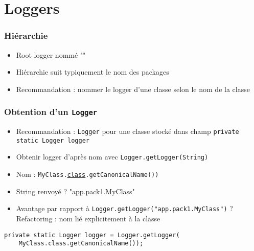 \documentclass[english, french]{beamer}
\begin{document}
\section{Loggers}
\begin{frame}
	\frametitle{Hiérarchie}
	\begin{itemize}
		\item Root logger nommé ""
		\item Hiérarchie suit typiquement le nom des packages
		\item Recommandation : nommer le logger d’une classe selon le nom de la classe
	\end{itemize}
\end{frame}

\begin{frame}[fragile]
	\frametitle{Obtention d’un \texttt{Logger}}
	\begin{itemize}
		\item Recommandation : \texttt{Logger} pour une classe stocké dans champ \texttt{private static Logger logger}
		\item Obtenir logger d’après nom avec \texttt{Logger.getLogger(String)}
		\item Nom : \texttt{MyClass.\href{https://docs.oracle.com/javase/8/docs/api/java/lang/Class.html}{class}.getCanonicalName())}
		\item String renvoyé ? \pause "app.pack1.MyClass" \pause
		\item Avantage par rapport à  \texttt{Logger.getLogger("app.pack1.MyClass")} ? \pause Refactoring : nom lié explicitement à la classe \pause
	\end{itemize}
	\begin{lstlisting}
private static Logger logger = Logger.getLogger(
    MyClass.class.getCanonicalName());
	\end{lstlisting}
\end{frame}
\end{document}
